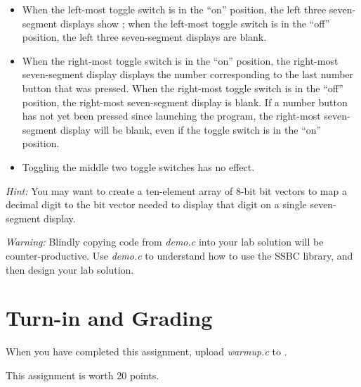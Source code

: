 \begin{itemize}
    \item When the left-most toggle switch is in the ``on'' position, the left
        three seven-segment displays show {}; when the
        left-most toggle switch is in the ``off'' position, the left three
        seven-segment displays are blank.
    \item When the right-most toggle switch is in the ``on'' position, the
        right-most seven-segment display displays the number corresponding to
        the last number button that was pressed. When the right-most toggle
        switch is in the ``off'' position, the right-most seven-segment display
        is blank. If a number button has not yet been pressed since launching
        the program, the right-most seven-segment display will be blank, even
        if the toggle switch is in the ``on'' position.
    \item Toggling the middle two toggle switches has no effect.
\end{itemize}

\textit{Hint:} You may want to create a ten-element array of 8-bit bit vectors
to map a decimal digit to the bit vector needed to display that digit on a
single seven-segment display.

\textit{Warning:} Blindly copying code from \textit{demo.c} into your lab
solution will be counter-productive. Use \textit{demo.c} to understand how
to use the SSBC library, and then design your lab solution.

\section*{Turn-in and Grading}

When you have completed this assignment, upload \textit{warmup.c} to
\filesubmission.

This assignment is worth 20 points. \\

